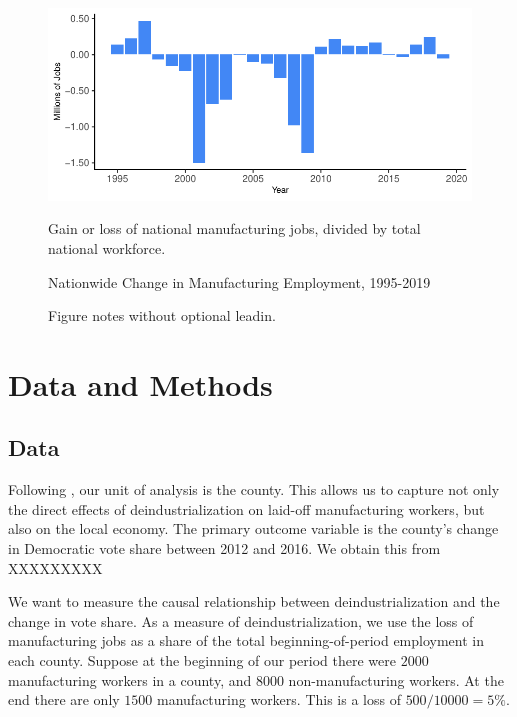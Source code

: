 \documentclass[]{AEA}
\begin{document}
\begin{figure} \label{natlPlot}
\caption{Nationwide Change in Manufacturing Employment, 1995-2019}

\begin{center}\includegraphics{Final-Draft_files/figure-latex/unnamed-chunk-3-1} \end{center}

\begin{figurenotes}
Gain or loss of national manufacturing jobs, divided by total national workforce.
\end{figurenotes}
\end{figure}

\begin{figure} \label{vShapePlot}
\caption{}

\begin{figurenotes}
Figure notes without optional leadin.
\end{figurenotes}
\end{figure}

\section{Data and Methods} 
\label{datamethods}

\subsection{Data} 
\label{datasec}

Following \cite{Baccini21}, our unit of analysis is the county. This
allows us to capture not only the direct effects of deindustrialization
on laid-off manufacturing workers, but also on the local economy. The
primary outcome variable is the county's change in Democratic vote share
between 2012 and 2016. We obtain this from XXXXXXXXX

We want to measure the causal relationship between deindustrialization
and the change in vote share. As a measure of deindustrialization, we
use the loss of manufacturing jobs as a share of the total
beginning-of-period employment in each county. Suppose at the beginning
of our period there were \(2000\) manufacturing workers in a county, and
\(8000\) non-manufacturing workers. At the end there are only \(1500\)
manufacturing workers. This is a loss of \(500/10000 = 5\%.\)
\end{document}
